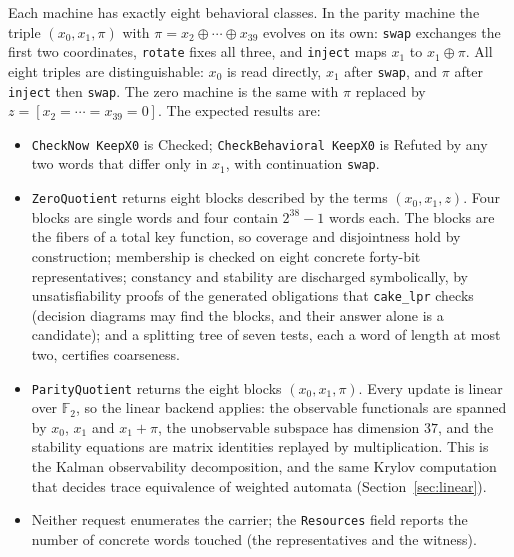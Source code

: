 \documentclass[11pt]{article}
\newcommand{\code}[1]{\texttt{#1}}
\newcommand{\F}{\mathbb{F}}
\theoremstyle{definition}
\theoremstyle{plain}
\begin{document}
Each machine has exactly eight behavioral classes. In the parity machine the triple
$(x_0,x_1,\pi)$ with $\pi=x_2\oplus\cdots\oplus x_{39}$ evolves on its own: \code{swap} exchanges
the first two coordinates, \code{rotate} fixes all three, and \code{inject} maps $x_1$ to
$x_1\oplus\pi$. All eight triples are distinguishable: $x_0$ is read directly, $x_1$ after
\code{swap}, and $\pi$ after \code{inject} then \code{swap}. The zero machine is the same with
$\pi$ replaced by $z=[x_2=\cdots=x_{39}=0]$. The expected results are:
\begin{itemize}
\item \code{CheckNow KeepX0} is Checked; \code{CheckBehavioral KeepX0} is Refuted by any two
words that differ only in $x_1$, with continuation \code{swap}.
\item \code{ZeroQuotient} returns eight blocks described by the terms $(x_0,x_1,z)$. Four blocks
are single words and four contain $2^{38}-1$ words each. The blocks are the fibers of a total key
function, so coverage and disjointness hold by construction; membership is checked on eight
concrete forty-bit representatives; constancy and stability are discharged symbolically, by
unsatisfiability proofs of the generated obligations that \code{cake\_lpr} checks (decision
diagrams may find the blocks, and their answer alone is a candidate); and a splitting tree of
seven tests, each a word of length at most two, certifies coarseness.
\item \code{ParityQuotient} returns the eight blocks $(x_0,x_1,\pi)$. Every update is linear over
$\F_2$, so the linear backend applies: the observable functionals are spanned by $x_0$, $x_1$ and
$x_1+\pi$, the unobservable subspace has dimension $37$, and the stability equations are matrix
identities replayed by multiplication. This is the Kalman observability decomposition, and the
same Krylov computation that decides trace equivalence of weighted automata
(Section~\ref{sec:linear}).
\item Neither request enumerates the carrier; the \code{Resources} field reports the number of
concrete words touched (the representatives and the witness).
\end{itemize}
\end{document}
